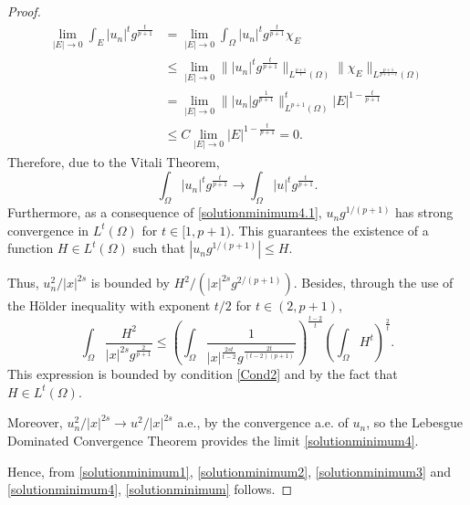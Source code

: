 \documentclass[preprint,12pt]{elsarticle}
\begin{document}
\begin{proof}
			\begin{align*}
				\lim_{|E|\rightarrow 0}\int_{E}|u_n|^{t}g^{\frac{t}{p+1}}&=	\lim_{|E|\rightarrow 0}\int_{\Omega}|u_n|^{t}g^{\frac{t}{p+1}} \chi_{E}				
				\\&\leq \lim_{|E|\rightarrow 0}\||u_n|^{t}g^{\frac{t}{p+1}}\|_{L^{\frac{p+1}{t}}(\Omega)}\|\chi_E\|_{L^{\frac{p+1}{p+1-t}}(\Omega)}\\
				&=	\lim_{|E|\rightarrow 0}\||u_n|g^{\frac{1}{p+1}}\|^t_{L^{p+1}(\Omega)}|E|^{1-\frac{t}{p+1}}\\&\leq C\lim_{|E|\rightarrow 0}|E|^{1-\frac{t}{p+1}}=0 .
			\end{align*}  	
			Therefore, due to the Vitali Theorem,
			\begin{equation}\label{solutionminimum4.1}
				\int_{\Omega}|u_n|^{t}g^{\frac{t}{p+1}}\rightarrow \int_{\Omega}|u|^{t}g^{\frac{t}{p+1}}.
			\end{equation}
			Furthermore, as a consequence of \eqref{solutionminimum4.1}, $u_ng^{1/(p+1)}$ has strong convergence in $L^{t}(\Omega)$ for $t\in [1,p+1)$. This guarantees the existence of a function $H\in L^{t}(\Omega)$ such that $|u_ng^{1/(p+1)}|\leq H$.
			
			Thus, $u_n^2/|x|^{2s}$ is bounded by $H^2/(|x|^{2s}g^{2/(p+1)})$.
			Besides, through the use of the H\"older inequality with exponent $t/2$ for $t\in (2,p+1)$, 
			\[\int_{\Omega}\frac{H^2}{|x|^{2s}g^{\frac{2}{p+1}}}\leq 
			\left(\int_{\Omega}\frac{1}{|x|^{\frac{2st}{t-2}}g^{\frac{2t}{(t-2)(p+1)}}}\right)
			^{\frac{t-2}{t}}
			\left(\int_{\Omega}H^{t}\right)^{\frac{2}
				{t}}.\]
			This expression is bounded by  condition \eqref{Cond2} and by the fact that $H\in L^{t}(\Omega)$.
			
			Moreover, $u_n^2/|x|^{2s}\rightarrow u^2/|x|^{2s}$ a.e., by the convergence a.e. of $u_n$, so the Lebesgue Dominated Convergence Theorem  provides  the limit \eqref{solutionminimum4}.
			
			
			Hence, from \eqref{solutionminimum1}, \eqref{solutionminimum2}, \eqref{solutionminimum3} and \eqref{solutionminimum4}, \eqref{solutionminimum} follows. 
			
		\end{proof}
		
		
		
\end{document}
